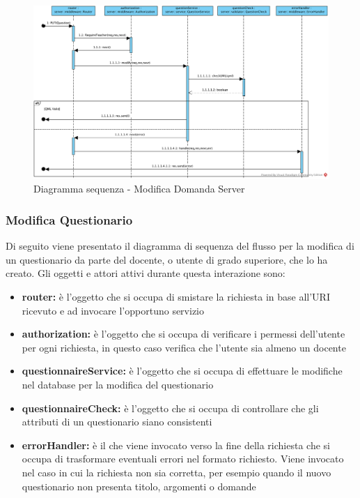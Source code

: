 \documentclass[12pt,a4paper]{article}
\begin{document}
\begin{center}
	\begin{figure}[H]
		\centering \includegraphics[max width=\myheight, angle=90]{../img/diagrammiSequenza/modificaDomandaServer.png}
		\caption{Diagramma sequenza - Modifica Domanda Server}
	\end{figure}
\end{center}

\newpage
\subsubsection{Modifica Questionario}
Di seguito viene presentato il diagramma di sequenza del flusso per la modifica di un questionario da parte del docente, o utente di grado superiore, che lo ha creato. Gli oggetti e attori attivi durante questa interazione sono:

\begin{itemize}
	\item \textbf{router:} è l'oggetto che si occupa di smistare la richiesta in base all’URI ricevuto e ad invocare l’opportuno servizio
	\item \textbf{authorization:} è l'oggetto che si occupa di verificare i permessi dell'utente per ogni richiesta, in questo caso verifica che l'utente sia almeno un docente
	\item \textbf{questionnaireService:} è l'oggetto che si occupa di effettuare le modifiche nel database per la modifica del questionario
	\item \textbf{questionnaireCheck:} è l'oggetto che si occupa di controllare che gli attributi di un questionario siano consistenti
	\item \textbf{errorHandler:} è il  che viene invocato verso la fine della richiesta che si occupa di trasformare eventuali errori nel formato  richiesto. Viene invocato nel caso in cui la richiesta non sia corretta, per esempio quando il nuovo questionario non presenta titolo, argomenti o domande
\end{itemize}
\end{document}
